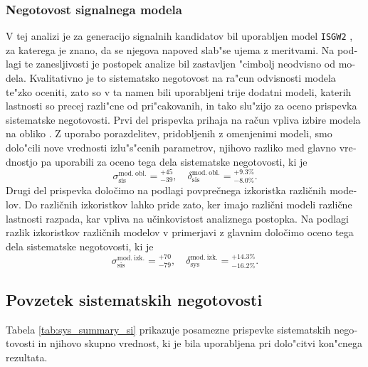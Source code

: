 \begin{otherlanguage}{slovene}
\subsubsection{Negotovost signalnega modela}
V tej analizi je za generacijo signalnih kandidatov bil uporabljen model \texttt{ISGW2} \cite{Scora:1995ty}, za katerega je znano, da se njegova napoved slab"se ujema z meritvami. Na podlagi te zanesljivosti je postopek analize bil zastavljen "cimbolj neodvisno od modela. Kvalitativno je to sistematsko negotovost na ra"cun odvisnosti modela te"zko oceniti, zato so v ta namen bili uporabljeni trije dodatni modeli, katerih lastnosti so precej razli"cne od pri"cakovanih, in tako slu"zijo za oceno prispevka sistematske negotovosti. Prvi del prispevka prihaja na račun vpliva izbire modela na obliko \varss. Z uporabo porazdelitev, pridobljenih z omenjenimi modeli, smo dolo"cili nove vrednosti izlu"s"cenih parametrov, njihovo razliko med glavno vrednostjo pa uporabili za oceno tega dela sistematske negotovosti, ki je
\begin{equation}
\sigma_{\mathrm{sis}}^{\mathrm{mod.~obl.}} = {}^{+45}_{-39},\quad \delta_{\mathrm{sis}}^{\mathrm{mod.~obl.}} = {}^{+9.3\%}_{-8.0\%}.
\end{equation}
Drugi del prispevka določimo na podlagi povprečnega izkoristka različnih modelov. Do različnih izkoristkov lahko pride zato, ker imajo različni modeli različne lastnosti razpada, kar vpliva na učinkovistost analiznega postopka. Na podlagi razlik izkoristkov različnih modelov v primerjavi z glavnim določimo oceno tega dela sistematske negotovosti, ki je
\begin{equation}
\sigma_{\mathrm{sis}}^{\mathrm{mod.~izk.}} = {}^{+70}_{-79},\quad \delta_{\mathrm{sys}}^{\mathrm{mod.~izk.}} = {}^{+14.3\%}_{-16.2\%}.
\end{equation}
\subsection{Povzetek sistematskih negotovosti}

Tabela \ref{tab:sys_summary_si} prikazuje posamezne prispevke sistematskih negotovosti in njihovo skupno vrednost, ki je bila uporabljena pri dolo"citvi kon"cnega rezultata.


\end{otherlanguage}
